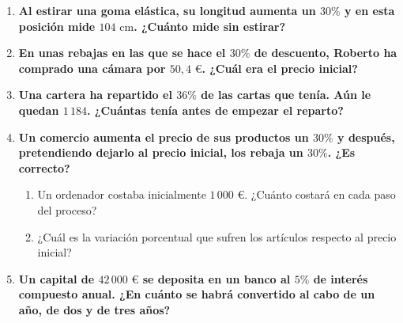 \documentclass[a4paper,12pt]{article}
\begin{document}
\begin{enumerate}
    \item \textbf{Al estirar una goma elástica, su longitud aumenta un $30\%$ y en esta posición mide $104\text{ cm}$. ¿Cuánto mide sin estirar?}

    \item \textbf{En unas rebajas en las que se hace el $30\%$ de descuento, Roberto ha comprado una cámara por $50{,}4\text{ €}$. ¿Cuál era el precio inicial?}

    \item \textbf{Una cartera ha repartido el $36\%$ de las cartas que tenía. Aún le quedan $1\,184$. ¿Cuántas tenía antes de empezar el reparto?}

    \item \textbf{Un comercio aumenta el precio de sus productos un $30\%$ y después, pretendiendo dejarlo al precio inicial, los rebaja un $30\%$. ¿Es correcto?}
        \begin{enumerate}[label=\alph*)]
            \item Un ordenador costaba inicialmente $1\,000\text{ €}$. ¿Cuánto costará en cada paso del proceso?
            \item ¿Cuál es la variación porcentual que sufren los artículos respecto al precio inicial?
        \end{enumerate}

    \item \textbf{Un capital de $42\,000\text{ €}$ se deposita en un banco al $5\%$ de interés compuesto anual. ¿En cuánto se habrá convertido al cabo de un año, de dos y de tres años?}

\end{enumerate}
\end{document}
